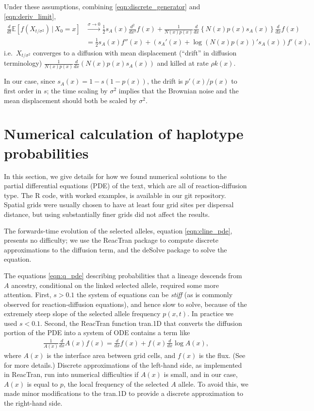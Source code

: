 \documentclass[11pt,letterpaper]{article}
\newcommand{\E}{\mathbb{E}}
\newcommand{\deriv}[1]{\frac{d}{d#1}}
\newcommand{\dderiv}[1]{\frac{d^2}{d#1^2}}
\newcommand{\given}{\,\vert\,}
\begin{document}
Under these assumptions, combining \eqref{eqn:discrete_generator} and \eqref{eqn:deriv_limit},
\begin{align}
    \deriv{t} \E[f(X_{t/\sigma^2}) \given X_0=x ] &\xrightarrow{\sigma \to 0} 
    \frac{1}{2} s_A(x) \dderiv{x} f(x) 
    + \frac{1}{N(x)p(x)} \deriv{x} \left\{ N(x)p(x) s_A(x) \right\}  \deriv{x} f(x) \\
    &= \frac{1}{2} s_A(x) f''(x) + \left( s_A'(x) + \log(N(x)p(x))' s_A(x) \right) f'(x) ,
\end{align}
i.e.\ $X_{t/\sigma^2}$ converges to a diffusion with mean displacement
(``drift'' in diffusion terminology) $\frac{1}{ N(x)p(x)} \deriv{x} ( N(x) p(x) s_A(x) )$ and killed at rate $\rho k(x)$.

In our case, since $s_A(x) = 1 - s (1-p(x))$, the drift is $p'(x)/p(x)$ to first order in $s$;
the time scaling by $\sigma^2$ implies that the Brownian noise and the mean displacement
should both be scaled by $\sigma^2$.


\section{Numerical calculation of haplotype probabilities}
\label{apx:haplotype_calcs}

In this section, we give details for how we found numerical solutions
to the partial differential equations (PDE) of the text,
which are all of reaction-diffusion type.
The R code, with worked examples, is available in our git repository.
Spatial grids were usually chosen to have at least four grid sites per dispersal distance,
but using substantially finer grids did not affect the results.

The forwards-time evolution of the selected alleles,
equation \eqref{eqn:cline_pde}, presents no difficulty;
we use the ReacTran package \citep{soetaert2012reactive} to compute discrete approximations to the diffusion term,
and the deSolve package \citep{soetaert2010solving} to solve the equation.

The equations \eqref{eqn:q_pde} describing probabilities that a lineage descends from $A$ ancestry,
conditional on the linked selected allele, required some more attention.
First, $s>0.1$ the system of equations can be \emph{stiff} 
(as is commonly observed for reaction-diffusion equations),
and hence slow to solve,
because of the extremely steep slope of the selected allele frequency $p(x,t)$.
In practice we used $s<0.1$.
Second, the ReacTran function tran.1D that converts the diffusion portion of the PDE into a system of ODE
contains a term like 
\begin{align*}
    \frac{1}{A(x)} \frac{d}{dx} A(x) f(x) = \frac{d}{dx} f(x) + f(x) \frac{d}{dx} \log A(x) ,
\end{align*}
where $A(x)$ is the interface area between grid cells, and $f(x)$ is the flux.
(See \citet{soetaert2012reactive} for more details.)
Discrete approximations of the left-hand side, as implemented in ReacTran, 
run into numerical difficulties if $A(x)$ is small,
and in our case, $A(x)$ is equal to $p$, the local frequency of the selected $A$ allele.
To avoid this, we made minor modifications to the tran.1D to provide a discrete approximation to the right-hand side.
\end{document}
